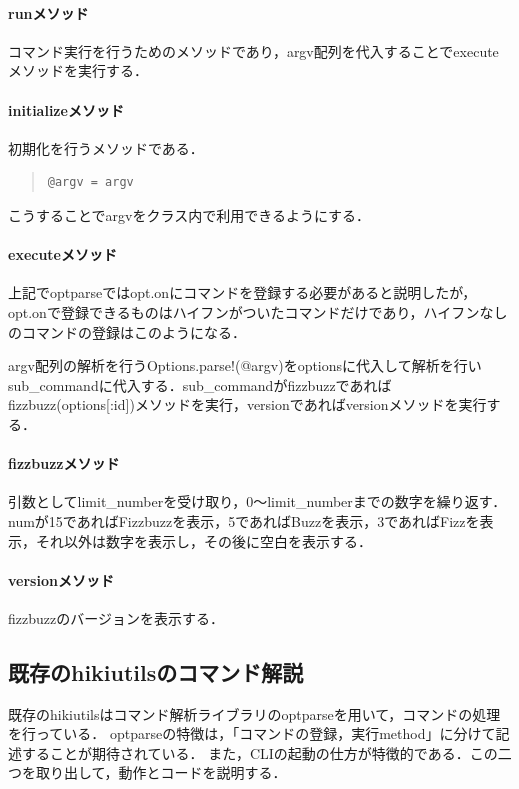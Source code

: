 \paragraph{runメソッド}
コマンド実行を行うためのメソッドであり，argv配列を代入することでexecuteメソッドを実行する．

\paragraph{initializeメソッド}
初期化を行うメソッドである．
\begin{quote}\begin{verbatim}
@argv = argv
\end{verbatim}\end{quote}
こうすることでargvをクラス内で利用できるようにする．

\paragraph{executeメソッド}
上記でoptparseではopt.onにコマンドを登録する必要があると説明したが，opt.onで登録できるものはハイフンがついたコマンドだけであり，ハイフンなしのコマンドの登録はこのようになる．

argv配列の解析を行うOptions.parse!(@argv)をoptionsに代入して解析を行いsub\_commandに代入する．sub\_commandがfizzbuzzであればfizzbuzz(options[:id])メソッドを実行，versionであればversionメソッドを実行する．

\paragraph{fizzbuzzメソッド}
引数としてlimit\_numberを受け取り，0〜limit\_numberまでの数字を繰り返す．numが15であればFizzbuzzを表示，5であればBuzzを表示，3であればFizzを表示，それ以外は数字を表示し，その後に空白を表示する．

\paragraph{versionメソッド}
fizzbuzzのバージョンを表示する．

\subsection{既存のhikiutilsのコマンド解説}
既存のhikiutilsはコマンド解析ライブラリのoptparseを用いて，コマンドの処理を行っている．
optparseの特徴は，「コマンドの登録，実行method」に分けて記述することが期待されている．
また，CLIの起動の仕方が特徴的である．この二つを取り出して，動作とコードを説明する．

